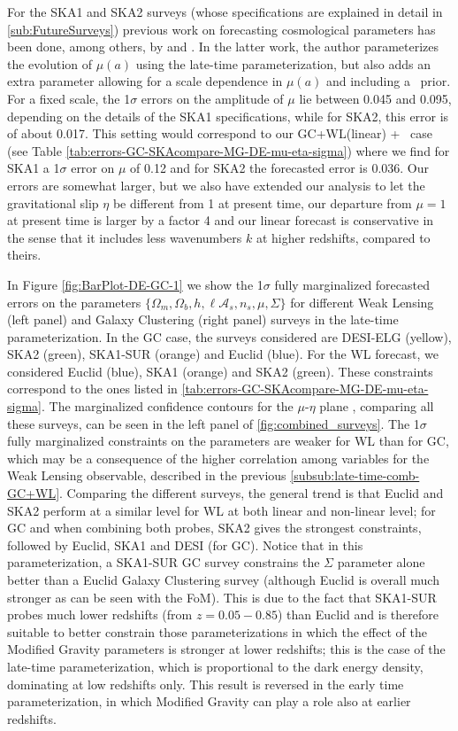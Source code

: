 For the SKA1 and SKA2 surveys (whose specifications are explained in detail in  \cref{sub:FutureSurveys}) 
\done{} 
previous work on forecasting cosmological parameters has been done, among others, by \cite{baker_observational_2015} and \cite{bull_extending_2015}. 
In the latter work, the author parameterizes the evolution of $\mu(a)$ using the late-time parameterization, but also adds an extra parameter
allowing for a scale dependence in $\mu(a)$ and including a \planck\ prior. For a fixed scale,
the 1$\sigma$ errors on the amplitude of $\mu$ lie between 0.045 and 0.095, depending on the details of the SKA1 specifications, while  
for SKA2, this error is of about 0.017. This setting would correspond to our GC+WL(linear) + \planck\ case 
(see Table \ref{tab:errors-GC-SKAcompare-MG-DE-mu-eta-sigma}) where we find for SKA1 a 1$\sigma$ error on $\mu$ of 0.12 and for SKA2 the forecasted error is 0.036.
Our errors are somewhat larger, but we also have extended our analysis to let the gravitational slip $\eta$ be different from 1 at present time, our departure from $\mu=1$ at present time is larger by a factor 4 and 
our linear forecast is conservative in the sense that it includes less wavenumbers $k$ at higher redshifts, compared to theirs.


In Figure \ref{fig:BarPlot-DE-GC-1} we show the 1$\sigma$ fully
marginalized forecasted errors on the parameters 
$\{\Omega_{m},\Omega_{b},h,\ell \mathcal{A}_{s},n_{s},\mu,\Sigma\}$
for different Weak Lensing (left panel) and Galaxy Clustering (right panel)
surveys in the late-time parameterization. In the GC case, the surveys
considered are DESI-ELG (yellow), SKA2 (green), SKA1-SUR (orange)
and Euclid (blue). For the WL forecast, we considered Euclid (blue),
SKA1 (orange) and SKA2 (green). These constraints correspond to the ones
listed in \cref{tab:errors-GC-SKAcompare-MG-DE-mu-eta-sigma}. 
The marginalized confidence contours for the $\mu$-$\eta$ plane , 
comparing all these surveys, can be seen in the left panel of \cref{fig:combined_surveys}.
The 1$\sigma$ fully marginalized
constraints on the parameters are weaker for WL than for GC,
which may be a consequence of the higher correlation among variables
for the Weak Lensing observable, described in the previous  \cref{subsub:late-time-comb-GC+WL}.
Comparing the different surveys,
the general trend is that Euclid and SKA2 perform at a similar level for WL at both linear and non-linear level; for GC and when combining both probes, SKA2
gives the strongest constraints, followed by Euclid, SKA1 and DESI (for GC).
Notice that in this parameterization, a SKA1-SUR GC survey constrains
the $\Sigma$ parameter alone better than a Euclid Galaxy Clustering
survey (although Euclid is overall much stronger as can be seen with the FoM). This is due to the fact that SKA1-SUR probes much lower
redshifts (from $z=0.05-0.85$) than Euclid and is therefore suitable to better constrain those parameterizations in which the effect of the Modified Gravity parameters is stronger at lower redshifts; this is the case of the late-time parameterization, which is proportional
to the dark energy density, dominating at low redshifts only. This result is reversed in the early time parameterization, in which Modified Gravity can play a role also at earlier redshifts. 


